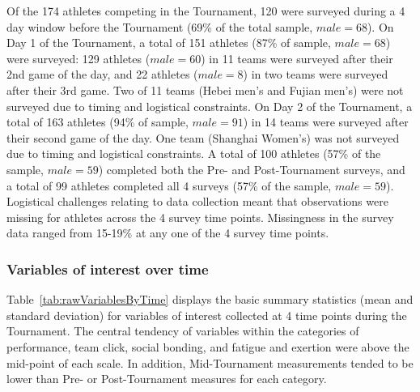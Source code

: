 \begin{CJK}{UTF8}{gbsn}
Of the 174 athletes competing in the Tournament, 120 were surveyed during a 4 day window before the Tournament (69\% of the total sample, $male = 68$).  On Day 1 of the Tournament, a total of 151 athletes (87\% of sample, $male = 68$) were surveyed: 129 athletes ($male = 60$) in 11 teams were surveyed after their 2nd game of the day, and 22 athletes ($male = 8$) in two teams were surveyed after their 3rd game. Two of 11 teams (Hebei men's and Fujian men's) were not surveyed due to timing and logistical constraints.  On Day 2 of the Tournament, a total of 163 athletes (94\% of sample, $male = 91$) in 14 teams were surveyed after their second game of the day. One team (Shanghai Women's) was not surveyed due to timing and logistical constraints.  A total of 100 athletes (57\% of the sample, $male = 59$) completed both the Pre- and Post-Tournament surveys, and a total of 99 athletes completed all 4 surveys (57\% of the sample, $male = 59$). Logistical challenges relating to data collection meant that observations were missing for athletes across the 4 survey time points. Missingness in the survey data ranged from 15-19\% at any one of the 4 survey time points.\\


\subsubsection{Variables of interest over time}
Table~\ref{tab:rawVariablesByTime} displays the basic summary statistics (mean and standard deviation) for variables of interest collected at 4 time points during the Tournament.  The central tendency of variables within the categories of performance, team click, social bonding, and fatigue and exertion were above the mid-point of each scale.  In addition, Mid-Tournament measurements tended to be lower than Pre- or Post-Tournament measures for each category.




\end{CJK}
